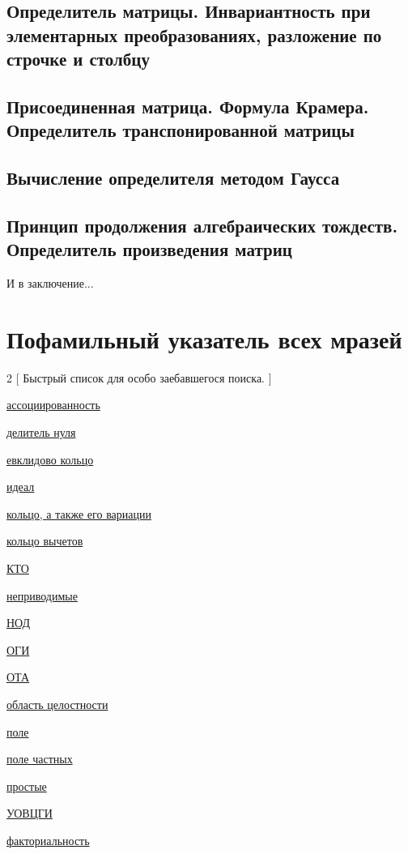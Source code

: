 \documentclass[a4paper,100pt]{article}
\theoremstyle{indented}
\theoremstyle{definition}
\theoremstyle{remark}
\begin{document}
\subsection{Определитель матрицы. Инвариантность при элементарных преобразованиях, разложение по строчке и столбцу}

\subsection{Присоединенная матрица. Формула Крамера. Определитель транспонированной матрицы}

\subsection{Вычисление определителя методом Гаусса}

\subsection{Принцип продолжения алгебраических тождеств. Определитель произведения матриц}



\newpage

\hypertarget{t2}{И в заключение...}



\section{Пофамильный указатель всех мразей}

\begin{multicols}{2}
    [
    Быстрый список для особо заебавшегося поиска.
    ]

    \hyperlink{n4}{ассоциированность}\
    
    \hyperlink{n3}{делитель нуля}\

    \hyperlink{n5}{евклидово кольцо}\

    \hyperlink{n9}{идеал}\
    
    \hyperlink{n1}{кольцо, а также его вариации}\

    \hyperlink{n14}{кольцо вычетов}\

    \hyperlink{n15}{КТО}\

    \hyperlink{n7}{неприводимые}\

    \hyperlink{n6}{НОД}\

    \hyperlink{n10}{ОГИ}\

    \hyperlink{n13}{ОТА}\

    \hyperlink{n2}{область целостности}\

    \hyperlink{n16}{поле}\

    \hyperlink{n18}{поле частных}\

    \hyperlink{n8}{простые}\ 

    \hyperlink{n11}{УОВЦГИ}\

    \hyperlink{n12}{факториальность}\
    

\end{multicols}
\end{document}
